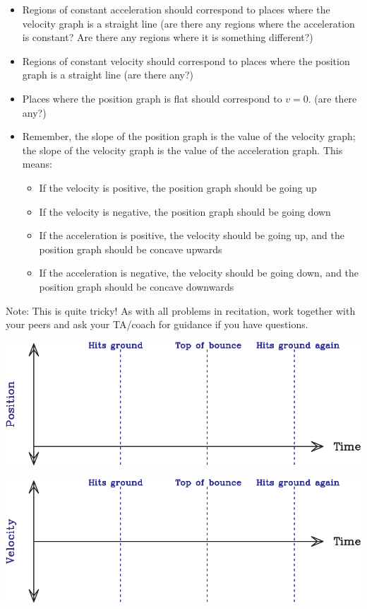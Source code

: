 \documentclass[12pt]{article}
\newcommand{\BI}{\begin{itemize}}
\newcommand{\EI}{\end{itemize}}
\begin{document}
\begin{enumerate}
\BI
    \item Regions of constant acceleration should correspond to places where the velocity graph is a straight line (are there any regions where the acceleration is constant? Are there any regions where it is something different?)
    \item Regions of constant velocity should correspond to places where the position graph is a straight line (are there any?)
    \item Places where the position graph is flat should correspond to $v=0$. (are there any?)
    \item Remember, the slope of the position graph is the value of the velocity graph; the slope of the velocity graph is the value of the acceleration graph. This means:
    \begin{itemize}
    	\item If the velocity is positive, the position graph should be going up
    	\item If the velocity is negative, the position graph should be going down
    	\item If the acceleration is positive, the velocity should be going up, and the position graph should be concave upwards
    	\item If the acceleration is negative, the velocity should be going down, and the position graph should be concave downwards
    \end{itemize}
\EI
     

Note: This is quite tricky! As with all problems in recitation, work together with your peers and ask your TA/coach for guidance if you have questions.


\newpage
\begin{center}
	\includegraphics[width=\textwidth]{position-crop.pdf}
	
	\vspace{0.4in}
	
	\includegraphics[width=\textwidth]{velocity-crop.pdf}
	

\end{center}
\end{enumerate}
\end{document}
